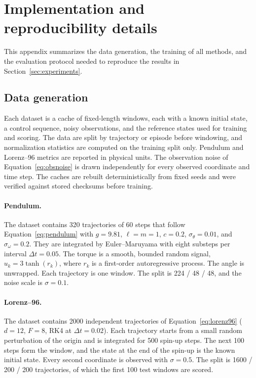\section{Implementation and reproducibility details}\label{app:reproducibility}
This appendix summarizes the data generation, the training of all methods, and the evaluation protocol needed to reproduce the results in Section~\ref{sec:experiments}.

\subsection{Data generation}\label{app:data}
Each dataset is a cache of fixed-length windows, each with a known initial state, a control sequence, noisy observations, and the reference states used for training and scoring. The data are split by trajectory or episode before windowing, and normalization statistics are computed on the training split only. Pendulum and Lorenz--96 metrics are reported in physical units. The observation noise of Equation~\eqref{eq:obsnoise} is drawn independently for every observed coordinate and time step. The caches are rebuilt deterministically from fixed seeds and were verified against stored checksums before training.

\paragraph{Pendulum.}
The dataset contains 320 trajectories of 60 steps that follow Equation~\eqref{eq:pendulum} with $g=9.81$, $\ell=m=1$, $c=0.2$, $\sigma_\theta=0.01$, and $\sigma_\omega=0.2$. They are integrated by Euler--Maruyama with eight substeps per interval $\Delta t=0.05$. The torque is a smooth, bounded random signal, $u_k=3\tanh(r_k)$, where $r_k$ is a first-order autoregressive process. The angle is unwrapped. Each trajectory is one window. The split is 224 / 48 / 48, and the noise scale is $\sigma=0.1$.

\paragraph{Lorenz--96.}
The dataset contains 2000 independent trajectories of Equation~\eqref{eq:lorenz96} ($d=12$, $F=8$, RK4 at $\Delta t=0.02$). Each trajectory starts from a small random perturbation of the origin and is integrated for 500 spin-up steps. The next 100 steps form the window, and the state at the end of the spin-up is the known initial state. Every second coordinate is observed with $\sigma=0.5$. The split is 1600 / 200 / 200 trajectories, of which the first 100 test windows are scored.

